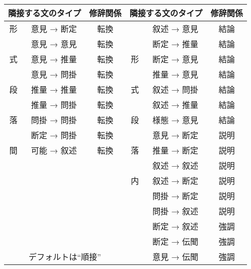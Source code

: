 \vspace*{1em}
\begin{tabular}{|c|c|c||c|c|c|} \hline
\multicolumn{2}{|c|}{隣接する文のタイプ} & 修辞関係 &
\multicolumn{2}{|c|}{隣接する文のタイプ} & 修辞関係 \\
\hline \hline
形 & 意見 → 断定 & 転換 &
   & 叙述 → 意見 & 結論 \\
\cline{2-3}\cline{5-6}
   & 意見 → 意見 & 転換 &
   & 断定 → 推量 & 結論 \\
\cline{2-3}\cline{5-6}
式 & 意見 → 推量 & 転換 &
形 & 断定 → 意見 & 結論 \\
\cline{2-3}\cline{5-6}
   & 意見 → 問掛 & 転換 &
   & 推量 → 意見 & 結論 \\
\cline{2-3}\cline{5-6}
段 & 推量 → 推量 & 転換 &
式 & 叙述 → 問掛 & 結論 \\
\cline{2-3}\cline{5-6}
   & 推量 → 問掛 & 転換 &
   & 叙述 → 推量 & 結論 \\
\cline{2-3}\cline{5-6}
落 & 問掛 → 問掛 & 転換 &
段 & 様態 → 意見 & 結論 \\
\cline{2-3}\cline{5-6}
   & 断定 → 問掛 & 転換 &
   & 意見 → 断定 & 説明 \\
\cline{2-3}\cline{5-6}
間 & 可能 → 叙述 & 転換 &
落 & 推量 → 断定 & 説明 \\
\cline{1-3}\cline{5-6}
\multicolumn{3}{|c||}{} &
   & 叙述 → 叙述 & 説明 \\
\cline{5-6}
\multicolumn{3}{|c||}{} &
内 & 叙述 → 断定 & 説明 \\
\cline{5-6}
\multicolumn{3}{|c||}{} &
   & 問掛 → 断定 & 説明 \\
\cline{5-6}
\multicolumn{3}{|c||}{} &
   & 問掛 → 叙述 & 説明 \\
\cline{5-6}
\multicolumn{3}{|c||}{} &
   & 断定 → 叙述 & 強調 \\
\cline{5-6}
\multicolumn{3}{|c||}{} &
   & 断定 → 伝聞 & 強調 \\
\cline{5-6}
\multicolumn{3}{|c||}{デフォルトは``順接''} &
   & 意見 → 伝聞 & 強調 \\
\hline
\end{tabular}



